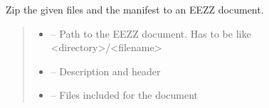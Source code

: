 \documentclass[letterpaper,10pt,english]{sphinxmanual}
\begin{document}
\begin{savenotes}
\begin{fulllineitems}

\begin{savenotes}\begin{fulllineitems}
\label{\detokenize{eezz:eezz.document.TDocuments.zip}}
\pysigstartsignatures
{}
\pysigstopsignatures
\sphinxAtStartPar
Zip the given files and the manifest to an EEZZ document.
\begin{quote}\begin{description}
\begin{itemize}
\item {} 
\sphinxAtStartPar
{} – Path to the EEZZ document. Has to be like <directory>/<filename>

\item {} 
\sphinxAtStartPar
{} – Description and header

\item {} 
\sphinxAtStartPar
{} – Files included for the document

\end{itemize}

\end{description}\end{quote}

\end{fulllineitems}\end{savenotes}


\end{fulllineitems}\end{savenotes}

\end{document}

